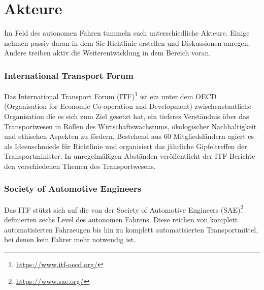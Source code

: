\section{Akteure}
\label{sec:akteure}

Im Feld des autonomen Fahren tummeln such unterschiedliche Akteure. Einige nehmen passiv daran in dem Sie Richtlinie erstellen und Diskussionen anregen. Andere treiben aktiv die Weiterentwicklung in dem Bereich voran.

\subsubsection*{International Transport Forum} Das International Transport Forum (ITF)\footnote{\url{https://www.itf-oecd.org/}} ist ein unter dem OECD (Organisation for Economic Co-operation and Development) zwischenstaatliche Organisation die es sich zum Ziel gesetzt hat, ein tieferes Verständnis über das Transportwesen in Rollen des Wirtschaftswachstums, ökologischer Nachhaltigkeit und ethischen Aspekten zu fördern. Bestehend aus 60 Mitgliedsländern agiert es als Ideenschmiede für Richtlinie und organisiert das jährliche Gipfeltreffen der Transportminister. In unregelmäßigen Abständen veröffentlicht der ITF Berichte den verschiedenen Themen des Transportwesens.

\subsubsection*{Society of Automotive Engineers \cite{standardSAE}\cite{smith2015automated}} Das ITF stützt sich auf die von der Society of Automotive Engineers (SAE)\footnote{\url{https://www.sae.org/}}  definierten sechs Level des autonomen Fahrens. Diese reichen von komplett automatisierten Fahrzeugen bis hin zu komplett automatisierten Transportmittel, bei denen kein Fahrer mehr notwendig ist.\\
